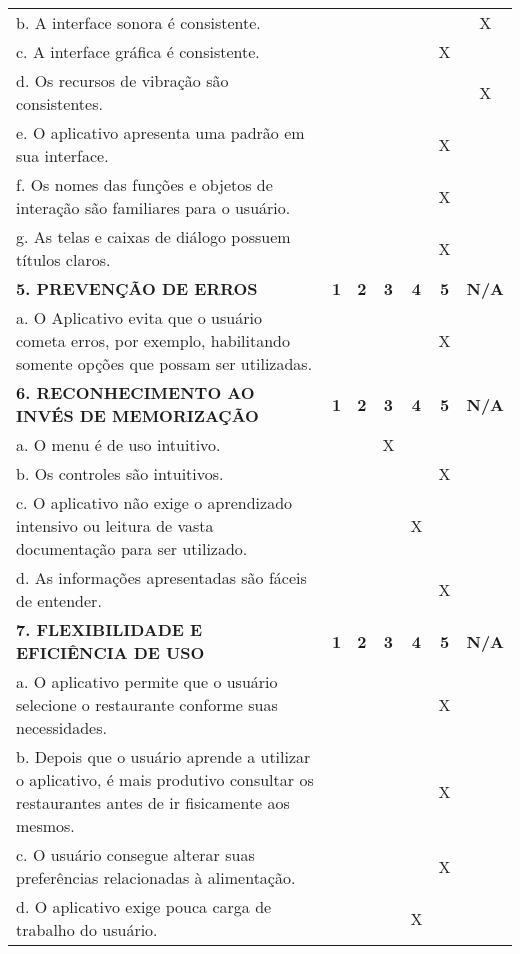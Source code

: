 \documentclass[portuguese,oneside]{tcc}
\begin{document}
\begin{center}
\begin{longtabu}{|L{25em}|c|c|c|c|c|c|}
	b. A interface sonora é consistente. & & & & & & X \\ 
	c. A interface gráfica é consistente. & & & & & X & \\ 
	d. Os recursos de vibração são consistentes. & & & & & & X \\ 
	e. O aplicativo apresenta uma padrão em sua interface. & & & & & X & \\ 
	f. Os nomes das funções e objetos de interação são familiares para o usuário. & & & & & X & \\ 
	g. As telas e caixas de diálogo possuem títulos claros. & & & & & X & \\ 
	\textbf{5. PREVENÇÃO DE ERROS} & \textbf{1} & \textbf{2} & \textbf{3} & \textbf{4} & \textbf{5} & \textbf{N/A} \\ 
	a. O Aplicativo evita que o usuário cometa erros, por exemplo, habilitando somente opções que possam ser utilizadas. & & & & & X & \\ 
	\textbf{6. RECONHECIMENTO AO INVÉS DE MEMORIZAÇÃO} & \textbf{1} & \textbf{2} & \textbf{3} & \textbf{4} & \textbf{5} & \textbf{N/A} \\ 
	a. O  menu é de uso intuitivo. & & & X & & & \\ 
	b. Os controles são intuitivos. & & & & & X & \\ 
	c. O aplicativo não exige o aprendizado intensivo ou leitura de vasta documentação para ser utilizado. & & & & X & & \\ 
	d. As informações apresentadas são fáceis de entender. & & & & & X & \\ 
	\textbf{7. FLEXIBILIDADE E EFICIÊNCIA DE USO} & \textbf{1} & \textbf{2} & \textbf{3} & \textbf{4} & \textbf{5} & \textbf{N/A} \\ 
	a. O aplicativo permite que o usuário selecione o restaurante conforme suas necessidades. & & & & & X & \\ 
	b. Depois que o usuário aprende a utilizar o aplicativo, é mais produtivo consultar os restaurantes antes de ir fisicamente aos mesmos. & & & & & X & \\ 
	c. O usuário consegue alterar suas preferências relacionadas à alimentação. & & & & & X & \\ 
	d. O aplicativo exige pouca carga de trabalho do usuário. & & & & X & & \\ 

\end{longtabu}
\end{center}
\end{document}
